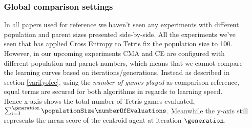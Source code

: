 \subsubsection{Global comparison settings}
In all papers used for reference we haven't seen any experiments with different population
and parent sizes presented side-by-side. All the experiments we've seen
that has applied Cross Entropy to Tetris fix the population size to 100. 
However, in our upcoming experiments
CMA and CE are configured with different population and parnet numbers, which means
that we cannot compare the learning curves based on iterations/generations. Instead as described
in section \ref{varifyofce}, using the  
\textit{number of games played} as comparison reference, equal terms are secured for both algorithms 
in regards to learning speed. \\
Hence x-axis shows the total number 
of Tetris games evaluated, 
$\sum_{i = 1}^{\generation} \populationSize \numberOfEvaluations$. 
Meanwhile the y-axis still represents the mean score 
of the centroid agent at iteration $\generation$.